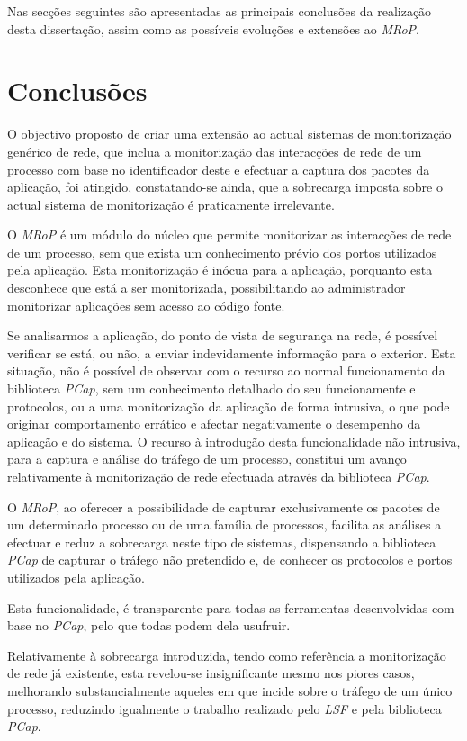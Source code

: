Nas secções seguintes são apresentadas as principais conclusões da realização desta dissertação, assim como as possíveis evoluções e extensões ao \textit{MRoP}.

\section{Conclusões}
\label{sec:conclusoes}

O objectivo proposto de criar uma extensão ao actual sistemas de monitorização genérico de rede, que inclua a monitorização das interacções de rede de um processo com base no identificador deste e efectuar a captura dos pacotes da aplicação, foi atingido, constatando-se ainda, que a sobrecarga imposta sobre o actual sistema de monitorização é praticamente irrelevante.

O \textit{MRoP} é um módulo do núcleo que permite monitorizar as interacções de rede de um processo, sem que exista um conhecimento prévio dos portos utilizados pela aplicação.
Esta monitorização é inócua para a aplicação, porquanto esta desconhece que está a ser monitorizada, possibilitando ao administrador monitorizar aplicações sem acesso ao código fonte.

Se analisarmos a aplicação, do ponto de vista de segurança na rede, é possível verificar se está, ou não, a enviar indevidamente informação para o exterior.
Esta situação, não é possível de observar com o recurso ao normal funcionamento da biblioteca \textit{PCap}, sem um conhecimento detalhado do seu funcionamente e protocolos, ou a uma monitorização da aplicação de forma intrusiva, o que pode originar comportamento errático e afectar negativamente o desempenho da aplicação e do sistema.
O recurso à introdução desta funcionalidade não intrusiva, para a captura e análise do tráfego de um processo, constitui um avanço relativamente à monitorização de rede efectuada através da biblioteca \textit{PCap}.

O \textit{MRoP}, ao oferecer a possibilidade de capturar exclusivamente os pacotes de um determinado processo ou de uma família de processos, facilita as análises a efectuar e reduz a sobrecarga neste tipo de sistemas, dispensando a biblioteca \textit{PCap} de capturar o tráfego não pretendido e, de conhecer os protocolos e portos utilizados pela aplicação.

Esta funcionalidade, é transparente para todas as ferramentas desenvolvidas com base no \textit{PCap}, pelo que todas podem dela usufruir.

Relativamente à sobrecarga introduzida, tendo como referência a monitorização de rede já existente, esta revelou-se insignificante mesmo nos piores casos, melhorando substancialmente aqueles em que incide sobre o tráfego de um único processo, reduzindo igualmente o trabalho realizado pelo \textit{LSF} e pela biblioteca \textit{PCap}.

